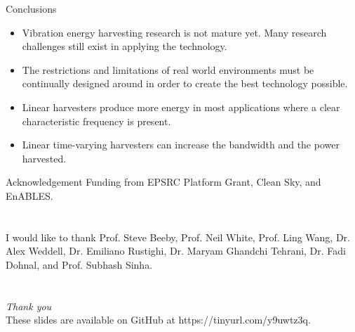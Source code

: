 \documentclass[LaTeX2e,10pt]{beamer}
\begin{document}
\begin{frame}{Conclusions}
\begin{itemize}
\setlength\itemsep{0.75cm}
\item Vibration energy harvesting research is not mature yet. Many research challenges still exist in applying the technology.
\item The restrictions and limitations of real world environments must be continually designed around in order to create the best technology possible.
\item Linear harvesters produce more energy in most applications where a clear characteristic frequency is present.
\item Linear time-varying harvesters can increase the bandwidth and the power harvested.
\end{itemize} 
\end{frame}
\begin{frame}{Acknowledgement}
\centering \Large
Funding from EPSRC Platform Grant, Clean Sky, and EnABLES.
\\~\\~\\ \small
I would like to thank Prof. Steve Beeby, Prof. Neil White, Prof. Ling Wang, Dr. Alex Weddell, Dr. Emiliano Rustighi, Dr. Maryam Ghandchi Tehrani, Dr. Fadi Dohnal, and Prof. Subhash Sinha.
\\~\\~\\
\emph{Thank you}\\[2em]These slides are available on GitHub at https://tinyurl.com/y9uwtz3q.
\end{frame}
\end{document}
